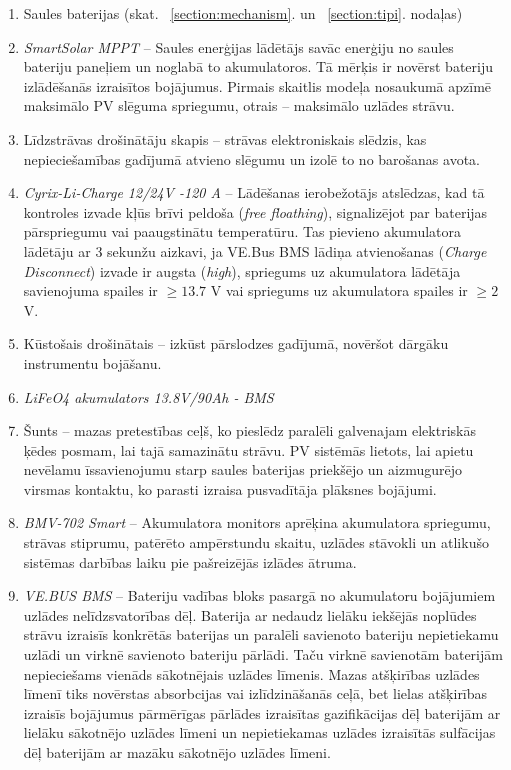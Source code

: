 \begin{enumerate}
\item Saules baterijas (skat. ~\ref{section:mechanism}. un ~\ref{section:tipi}. nodaļas)
\item \emph{SmartSolar MPPT} --
Saules enerģijas lādētājs savāc enerģiju no saules bateriju paneļiem un noglabā to akumulatoros. Tā mērķis ir novērst bateriju izlādēšanās izraisītos bojājumus. Pirmais skaitlis modeļa nosaukumā apzīmē maksimālo PV slēguma spriegumu, otrais -- maksimālo uzlādes strāvu.
\item Līdzstrāvas drošinātāju skapis --
strāvas elektroniskais slēdzis, kas nepieciešamības gadījumā atvieno slēgumu un izolē to no barošanas avota.
\item \emph{Cyrix-Li-Charge 12/24V -120 A} --
Lādēšanas ierobežotājs atslēdzas, kad tā kontroles izvade kļūs brīvi peldoša (\textit{free floathing}), signalizējot par baterijas pārspriegumu vai paaugstinātu temperatūru. Tas pievieno akumulatora lādētāju ar 3 sekunžu aizkavi, ja VE.Bus BMS lādiņa atvienošanas (\textit{Charge Disconnect}) izvade ir augsta (\textit{high}), spriegums uz akumulatora lādētāja savienojuma spailes ir $\geq 13.7$ V vai spriegums uz akumulatora spailes ir $\geq 2$V.
\item Kūstošais drošinātais --
izkūst pārslodzes gadījumā, novēršot dārgāku instrumentu bojāšanu.
\item \emph{LiFeO4 akumulators 13.8V/90Ah - BMS}
\item Šunts -- mazas pretestības ceļš, ko pieslēdz paralēli galvenajam elektriskās ķēdes posmam, lai tajā samazinātu strāvu. PV sistēmās lietots, lai apietu nevēlamu īssavienojumu starp saules baterijas priekšējo un aizmugurējo virsmas kontaktu, ko parasti izraisa pusvadītāja plāksnes bojājumi.
\item \emph{BMV-702 Smart} --
Akumulatora monitors aprēķina akumulatora spriegumu, strāvas stiprumu, patērēto ampērstundu skaitu, uzlādes stāvokli un atlikušo sistēmas darbības laiku pie pašreizējās izlādes ātruma.
\item \emph{VE.BUS BMS} --
Bateriju vadības bloks pasargā no akumulatoru bojājumiem uzlādes nelīdzsvatorības dēļ. Baterija ar nedaudz lielāku iekšējās noplūdes strāvu
izraisīs konkrētās baterijas un paralēli savienoto bateriju nepietiekamu uzlādi un virknē savienoto bateriju pārlādi. Taču virknē savienotām baterijām nepieciešams vienāds sākotnējais uzlādes līmenis. Mazas atšķirības uzlādes līmenī tiks novērstas absorbcijas vai izlīdzināšanās ceļā, bet lielas atšķirības izraisīs bojājumus pārmērīgas pārlādes izraisītas gazifikācijas dēļ baterijām ar lielāku sākotnējo uzlādes līmeni un nepietiekamas uzlādes izraisītās sulfācijas dēļ baterijām ar mazāku sākotnējo uzlādes līmeni.


\end{enumerate}
